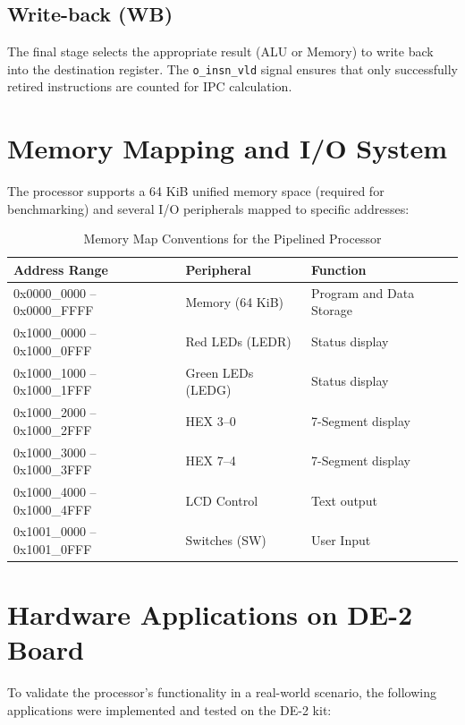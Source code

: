 \subsection{Write-back (WB)}
The final stage selects the appropriate result (ALU or Memory) to write back into the destination register. The \texttt{o\_insn\_vld} signal ensures that only successfully retired instructions are counted for IPC calculation.

\newpage
\section{Memory Mapping and I/O System}
The processor supports a 64 KiB unified memory space (required for benchmarking) and several I/O peripherals mapped to specific addresses:

\begin{table}[h!]
	\centering
	\begin{tabular}{lll}
		\toprule
		\textbf{Address Range} & \textbf{Peripheral} & \textbf{Function} \\
		\midrule
		0x0000\_0000 -- 0x0000\_FFFF & Memory (64 KiB) & Program and Data Storage \\
		0x1000\_0000 -- 0x1000\_0FFF & Red LEDs (LEDR) & Status display \\
		0x1000\_1000 -- 0x1000\_1FFF & Green LEDs (LEDG) & Status display \\
		0x1000\_2000 -- 0x1000\_2FFF & HEX 3--0 & 7-Segment display \\
		0x1000\_3000 -- 0x1000\_3FFF & HEX 7--4 & 7-Segment display \\
		0x1000\_4000 -- 0x1000\_4FFF & LCD Control & Text output \\
		0x1001\_0000 -- 0x1001\_0FFF & Switches (SW) & User Input \\
		\bottomrule
	\end{tabular}
	\caption{Memory Map Conventions for the Pipelined Processor}
\end{table}

\newpage
\section{Hardware Applications on DE-2 Board}
To validate the processor's functionality in a real-world scenario, the following applications were implemented and tested on the DE-2 kit:

